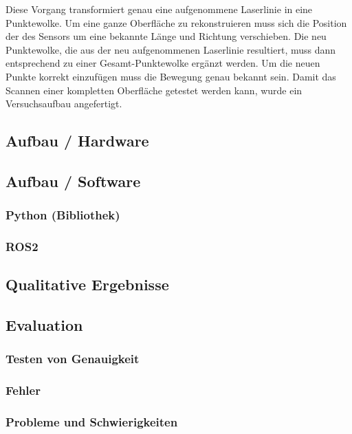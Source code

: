 	Diese Vorgang transformiert genau eine aufgenommene Laserlinie in eine Punktewolke. Um eine ganze Oberfläche zu rekonstruieren muss sich die Position der des Sensors um eine bekannte Länge und Richtung verschieben. Die neu Punktewolke, die aus der neu aufgenommenen Laserlinie resultiert, muss dann entsprechend zu einer Gesamt-Punktewolke ergänzt werden. Um die neuen Punkte korrekt einzufügen muss die Bewegung genau bekannt sein. Damit das Scannen einer kompletten Oberfläche getestet werden kann, wurde ein Versuchsaufbau angefertigt.
	
	\subsection{Aufbau / Hardware}
		\label{chap:aufbau_hardware}
	
	\subsection{Aufbau / Software}
		\subsubsection{Python (Bibliothek)}
		\subsubsection{ROS2}
		
	\subsection{Qualitative Ergebnisse}
	
	\subsection{Evaluation}
		\subsubsection{Testen von Genauigkeit}
		\subsubsection{Fehler}
		\subsubsection{Probleme und Schwierigkeiten}
			\label{chap:probleme_schwierigkeiten}